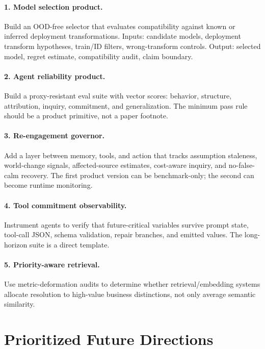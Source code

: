 \documentclass[11pt]{article}
\begin{document}
\paragraph{1. Model selection product.}
Build an OOD-free selector that evaluates compatibility against known or
inferred deployment transformations. Inputs: candidate models, deployment
transform hypotheses, train/ID filters, wrong-transform controls. Output:
selected model, regret estimate, compatibility audit, claim boundary.

\paragraph{2. Agent reliability product.}
Build a proxy-resistant eval suite with vector scores: behavior, structure,
attribution, inquiry, commitment, and generalization. The minimum pass rule
should be a product primitive, not a paper footnote.

\paragraph{3. Re-engagement governor.}
Add a layer between memory, tools, and action that tracks assumption staleness,
world-change signals, affected-source estimates, cost-aware inquiry, and
no-false-calm recovery. The first product version can be benchmark-only; the
second can become runtime monitoring.

\paragraph{4. Tool commitment observability.}
Instrument agents to verify that future-critical variables survive prompt
state, tool-call JSON, schema validation, repair branches, and emitted values.
The long-horizon suite is a direct template.

\paragraph{5. Priority-aware retrieval.}
Use metric-deformation audits to determine whether retrieval/embedding systems
allocate resolution to high-value business distinctions, not only average
semantic similarity.

\section{Prioritized Future Directions}
\end{document}
